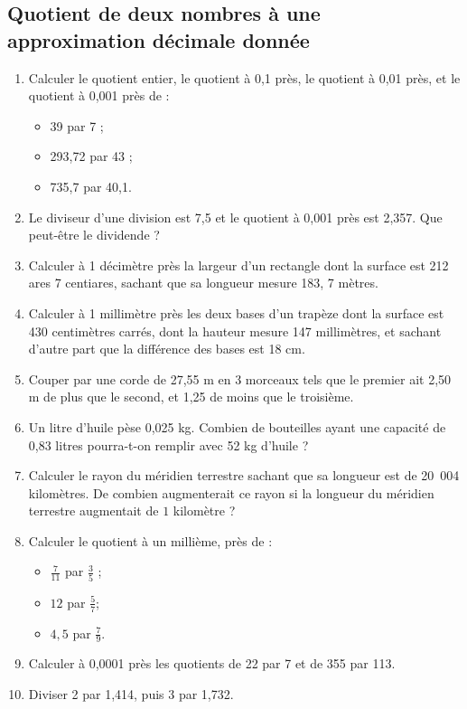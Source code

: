 \documentclass[12 pt]{extarticle}
\theoremstyle{plain}
\begin{document}
 \subsection{Quotient de deux nombres à une approximation décimale donnée}
 
 \begin{enumerate}
 \item Calculer le quotient entier, le quotient à 0,1 près, le quotient à 0,01 près, et le quotient à 0,001 près de : 
 \begin{itemize}
 \item 39 par 7 ;
 \item 293,72 par 43 ; 
 \item 735,7 par 40,1. 
 \end{itemize}
 \item Le diviseur d'une division est 7,5 et le quotient à 0,001 près est 2,357. Que peut-être le dividende ? 
 \item Calculer à 1 décimètre près la largeur d'un rectangle dont la surface est 212 ares 7 centiares, sachant que sa longueur mesure 183, 7 mètres. 
 \item Calculer à 1 millimètre près les deux bases d'un trapèze dont la surface est 430 centimètres carrés, dont la hauteur mesure 147 millimètres, et sachant d'autre part que la différence des bases est 18 cm. 
 \item Couper par une corde de 27,55 m en 3 morceaux tels que le premier ait 2,50 m de plus que le second, et 1,25 de moins que le troisième.
 \item Un litre d'huile pèse 0,025 kg. Combien de bouteilles ayant une capacité de 0,83 litres pourra-t-on remplir avec 52 kg d'huile ? 
 \item Calculer le rayon du méridien terrestre sachant que sa longueur est de 20~004 kilomètres. De combien augmenterait ce rayon si la longueur du méridien terrestre augmentait de $1$ kilomètre ? 
 \item Calculer le quotient à un millième, près de : 
 \begin{itemize}
 \item $\frac7{11}$ par $\frac35$ ; 
 \item $12$ par $\frac57$; 
 \item $4,5$ par $\frac79$. 
 \end{itemize}
\item Calculer à 0,0001 près les quotients de 22 par 7 et de 355 par 113. 
\item Diviser 2 par 1,414, puis 3 par 1,732. 

\end{enumerate}
\end{document}
